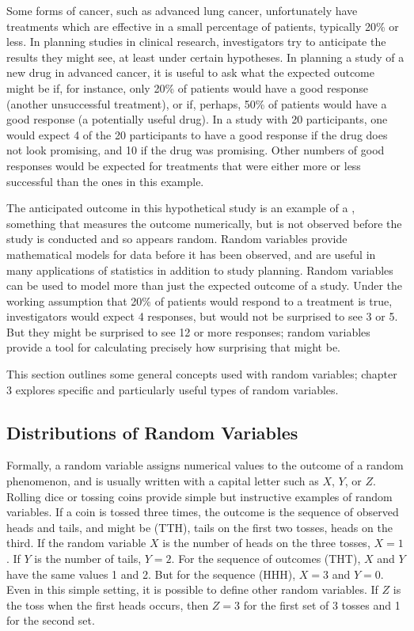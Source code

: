 \begin{doublespace}
Some forms of cancer, such as advanced lung cancer, unfortunately have treatments which are effective in a small percentage of patients, typically 20\% or less. In planning studies in clinical research, investigators try to anticipate the results they might see, at least under certain hypotheses. In planning a study of a new drug in advanced cancer, it is useful to ask what the expected outcome might be if, for instance, only 20\% of patients would have a good response (another unsuccessful treatment), or if, perhaps, 50\% of patients would have a good response (a potentially useful drug). In a study with 20 participants, one would expect 4 of the 20 participants to have a good response if the drug does not look promising, and 10 if the drug was promising. Other numbers of good responses would be expected for treatments that were either more or less successful than the ones in this example.

The anticipated outcome in this hypothetical study is an example of a , something that measures the outcome numerically, but is not observed before the study is conducted and so appears random. Random variables provide mathematical models for data before it has been observed, and are useful in many applications of statistics in addition to study planning. Random variables can be used to model more than just the expected outcome of a study. Under the working assumption that 20\% of patients would respond to a treatment is true, investigators would expect 4 responses, but would not be surprised to see 3 or 5. But they might be surprised to see 12 or more responses; random variables provide a tool for calculating precisely how surprising that might be.

This section outlines some general concepts used with random variables; chapter 3 explores specific and particularly useful types of random variables.

\subsection{Distributions of Random Variables}

Formally, a random variable assigns numerical values to the outcome of a random phenomenon, and is usually written with a capital letter such as $X$, $Y$, or $Z$.  Rolling dice or tossing coins provide simple but instructive examples of random variables.  If a coin is tossed three times, the outcome is the sequence of observed heads and tails, and might be (TTH), tails on the first two tosses, heads on the third.  If the random variable $X$ is the number of heads on the three tosses, $X = 1$. If $Y$ is the number of tails, $Y = 2$.  For the sequence of outcomes (THT), $X$ and $Y$ have the same values 1 and 2. But for the sequence (HHH), $X = 3$ and $Y = 0$.  Even in this simple setting, it is possible to define other random variables.  If $Z$ is the toss when the first heads occurs, then $Z=3$ for the first set of 3 tosses and 1 for the second set.


\end{doublespace}
